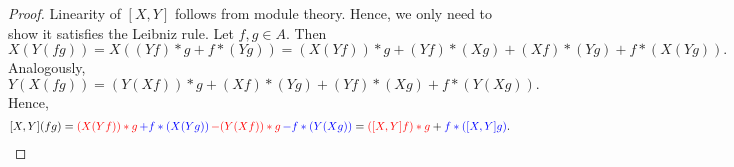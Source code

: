 \begin{proof}
  Linearity of $[X, Y]$ follows from module theory.
  Hence, we only need to show it satisfies the Leibniz rule.
  Let $f, g \in A$.
  Then
  \begin{equation}
    X(Y(f g))
    = X((Y f) * g + f * (Y g))
    = (X(Y f)) * g + (Y f) * (X g) + (X f) * (Y g) + f * (X (Y g)).
  \end{equation}
  Analogously,
  \begin{equation}
    Y(X(f g)) = (Y(X f)) * g + (X f) * (Y g) + (Y f) * (X g) + f * (Y (X g)).
  \end{equation}
  Hence,
  \begin{equation}
    \begin{split}
      [X, Y](f g)
      = {\color{red} (X(Y f)) * g}\,
        {\color{blue} + f * (X (Y g))}\,
        {\color{red} - (Y(X f)) * g}\,
        {\color{blue}- f * (Y (X g))}
      = {\color{red}([X, Y] f) * g} + {\color{blue} f * ([X, Y] g)}.
      \qedhere
    \end{split}
  \end{equation}
\end{proof}
